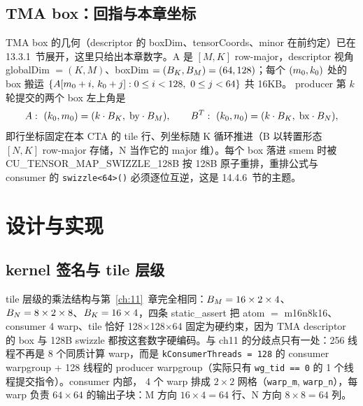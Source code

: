 \subsection{TMA box：回指与本章坐标}

TMA box 的几何（descriptor 的 boxDim、tensorCoords、minor 在前约定）已在
13.3.1~节展开，这里只给出本章数字。A 是 $[M, K]$ row-major，descriptor 视角
globalDim $= (K, M)$、boxDim $= (B\sb{K}, B\sb{M}) = (64, 128)$；每个
$(m\sb{0}, k\sb{0})$ 处的 box 搬运
$\{A[m\sb{0}+i,\, k\sb{0}+j] : 0 \le i < 128,\ 0 \le j < 64\}$ 共 16KB。
producer 第 $k$ 轮提交的两个 box 左上角是
\begin{equation}
  A:\ (k\sb{0}, m\sb{0}) = (k \cdot B\sb{K},\; \mathrm{by} \cdot B\sb{M}),
  \qquad
  B^{T}:\ (k\sb{0}, n\sb{0}) = (k \cdot B\sb{K},\; \mathrm{bx} \cdot B\sb{N}) ,
\end{equation}
即行坐标固定在本 CTA 的 tile 行、列坐标随 K 循环推进（B 以转置形态
$[N, K]$ row-major 存储，N 当作它的 major 维）。每个 box 落进 smem 时被
CU\_TENSOR\_MAP\_SWIZZLE\_128B 按 128B 原子重排，重排公式与 consumer 的
\texttt{swizzle\allowbreak{}<64>\allowbreak{}()} 必须逐位互逆，这是 14.4.6~节的主题。

\section{设计与实现}

\subsection{kernel 签名与 tile 层级}



tile 层级的乘法结构与第~\ref{ch:11}~章完全相同：$B\sb{M} = 16 \times 2 \times 4$、
$B\sb{N} = 8 \times 2 \times 8$、$B\sb{K} = 16 \times 4$，四条 static\_assert 把
atom $=$ m16n8k16、consumer 4 warp、tile 恰好 128$\times$128$\times$64
固定为硬约束，因为 TMA descriptor 的 box 与 128B swizzle 都按这套数字硬编码。与
ch11 的分歧点只有一处：256 线程不再是 8 个同质计算 warp，而是
\texttt{k\allowbreak{}Consumer\allowbreak{}Threads =\allowbreak{} 128} 的 consumer warpgroup + 128 线程的 producer
warpgroup（实际只有 \texttt{wg\_tid == 0} 的 1 个线程提交指令）。consumer 内部，
4 个 warp 排成 $2\times2$ 网格（\texttt{warp\_m}, \texttt{warp\_n}），每 warp
负责 $64 \times 64$ 的输出子块：M 方向 $16 \times 4 = 64$ 行、N 方向
$8 \times 8 = 64$ 列。

